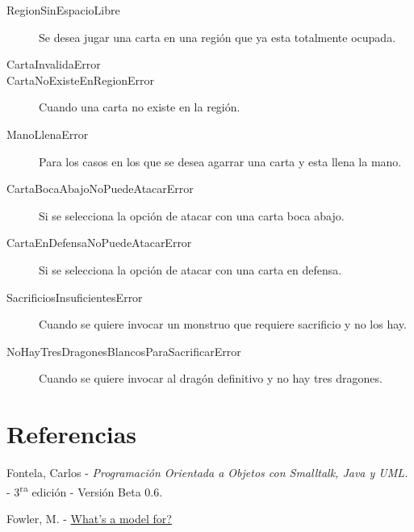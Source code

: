 \begin{description}

\item[RegionSinEspacioLibre] Se desea jugar una carta en una región que ya esta totalmente ocupada.

\item[CartaInvalidaError]

\item[CartaNoExisteEnRegionError] Cuando una carta no existe en la región.

\item[ManoLlenaError] Para los casos en los que se desea agarrar una carta y esta llena la mano.

\item[CartaBocaAbajoNoPuedeAtacarError] Si se selecciona la opción de atacar con una carta boca abajo.

\item[CartaEnDefensaNoPuedeAtacarError] Si se selecciona la opción de atacar con una carta en defensa.

\item[SacrificiosInsuficientesError] Cuando se quiere invocar un monstruo que requiere sacrificio y no los hay.

\item[NoHayTresDragonesBlancosParaSacrificarError] Cuando se quiere invocar al dragón definitivo y no hay tres dragones.

\end{description}

\appendix
\section{Referencias}
\begingroup
\renewcommand{\section}[2]{}
\begin{thebibliography}{10}
	 Fontela, Carlos - \emph{Programación Orientada a Objetos con Smalltalk, Java y UML.} - 3\textsuperscript{ra} edición - Versión Beta 0.6.
	
	 Fowler, M. - \hyperref{https://martinfowler.com/distributedComputing/purpose.pdf}{}{}{What's a model for?}
\end{thebibliography}
\endgroup


